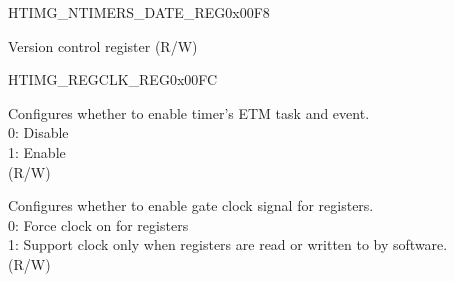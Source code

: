 \begin{register}{H}{TIMG\_NTIMERS\_DATE\_REG}{0x00F8}\label{regdesc:TIMGNTIMERSDATEREG}
%
%
\regnewline%
\begin{regdesc}\begin{reglist}
\label{fielddesc:TIMGNTIMGSDATE}\item [TIMG\_NTIMGS\_DATE] Version control register (R/W)
\end{reglist}\end{regdesc}
\end{register}


\begin{register}{H}{TIMG\_REGCLK\_REG}{0x00FC}\label{regdesc:TIMGREGCLKREG}
%
%
%
%
\regnewline%
\begin{regdesc}\begin{reglist}
\label{fielddesc:TIMGETMEN}\item [TIMG\_ETM\_EN] Configures whether to enable timer's ETM task and event. \\
0: Disable \\
1: Enable \\ (R/W)
\label{fielddesc:TIMGCLKEN}\item [TIMG\_CLK\_EN] Configures whether to enable gate clock signal for registers. \\
0: Force clock on for registers \\
1: Support clock only when registers are read or written to by software. \\ (R/W)
\end{reglist}\end{regdesc}
\end{register}
